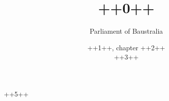 \documentclass[12pt,letterpaper,titlepage]{report}
\author{Parliament of Baustralia}
\title{++0++}
\date{++1++, chapter ++2++\\++3++}
\begin{document}
\maketitle
++5++
\end{document}
